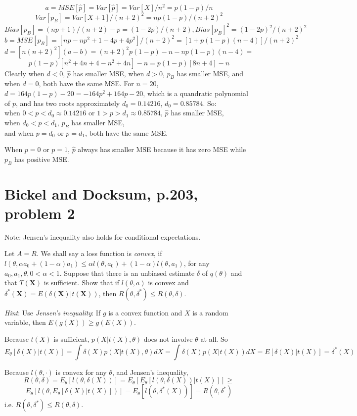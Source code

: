 \documentclass[11pt]{article}
\newcommand{\ProbS}{\iftrue}
\newcommand{\ProbE}{\fi}
\begin{document}
$$
a = MSE[\hat{p}] = Var[\hat{p}] = Var[X] / n^2 = p(1-p)/n
$$
$$
Var[{p}_B] = Var[X+1] / (n+2)^2 = np(1-p)/(n+2)^2
$$
$$
Bias[{p}_B] = (np+1)/(n+2)-p
= (1-2p)/(n+2),
Bias[{p}_B]^2 = (1-2p)^2/(n+2)^2
$$
$$
b = MSE[{p}_B] = [np-np^2+1-4p+4p^2]/(n+2)^2
=[1+p(1-p)(n-4)]/(n+2)^2
$$
$$
d = [n(n+2)^2](a-b) = (n+2)^2 p(1-p) - n - np(1-p)(n-4) =
$$
$$
p(1-p)[n^2+4n+4-n^2+4n] - n =
p(1-p)[8n+4] - n
$$
Clearly when $d<0$, $\hat{p}$ has smaller MSE,
when $d>0$, $p_B$ has smaller MSE,
and when $d=0$, both have the same MSE.
For $n=20$, $d=164p(1-p)-20 = -164p^2 + 164p - 20$, which is a quandratic polynomial of $p$, and has two roots approximately $d_0=0.14216$, $d_0=0.85784$. So:\\
when $0 < p < d_0 \approx 0.14216$ or $1 > p > d_1 \approx 0.85784$, $\hat{p}$ has smaller MSE, \\
when $d_0 < p < d_1$, $p_B$ has smaller MSE,\\
and when $p=d_0$ or $p=d_1$, both have the same MSE.

When $p=0$ or $p=1$, $\hat{p}$ always has smaller MSE because it has zero MSE while $p_B$ has positive MSE.

\section{Bickel and Docksum, p.203, problem 2}
\ProbS
Note: Jensen's inequality also holds for conditional expectations.

Let $A=R$. We shall say a loss function is \emph{convex}, if
$l(\theta, \alpha a_0 + (1-\alpha)a_1) \leq
\alpha l(\theta, a_0) + (1-\alpha)l(\theta, a_1)$,
for any $a_0, a_1, \theta, 0<\alpha<1$.
Suppose that there is an unbiased estimate $\delta$ of $q(\theta)$
and that $T(\mathbf{X})$ is sufficient.
Show that if $l(\theta, a)$ is convex and
$\delta^{*}(\mathbf{X}) = E(\delta(\mathbf{X}) | t(\mathbf{X}))$,
then $R(\theta, \delta^{*}) \leq R(\theta, \delta)$.

\emph{Hint}: Use \emph{Jensen's inequality}: If $g$ is a convex function and $X$ is a random variable, then $E(g(X)) \geq g(E(X))$.
\ProbE

Because $t(X)$ is sufficient, $p(X | t(X), \theta)$ does not involve $\theta$ at all. So
$$
E_{\theta}[\delta(X) | t(X)] =
\int \delta(X)p(X | t(X), \theta) dX =
\int \delta(X)p(X | t(X)) dX =
E[ \delta(X) | t(X) ] =
\delta^*(X)
$$

Because $l(\theta, \cdot)$ is convex for any $\theta$, and Jensen's inequality,
$$
R(\theta, \delta) =
E_\theta[l(\theta, \delta(X))] =
E_\theta[ E_\theta[l(\theta, \delta(X)) | t(X)] ] \geq
$$
$$
E_\theta[l(\theta, E_\theta[\delta(X) | t(X)])] =
E_\theta[l(\theta, \delta^*(X))] =
R(\theta, \delta^*)
$$
i.e. $R(\theta, \delta^*) \leq R(\theta, \delta)$.
\end{document}
